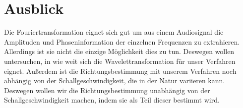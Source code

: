 \section{Ausblick} %
\iffalse
Da unser Verfahren über die Least Squares Methode sehr leicht auf eine beliebige Anzahl von Mikrofonen erweiterbar ist, wollen wir die Genauigkeit und insbesondere die Reichweite der Richtungsbestimmung noch weiter erhöhen, indem wir anstelle von vier Mikrofonen acht Mikrofone verwenden. Dies würde es uns außerdem erlauben, die Richtungsbestimmung unabhängig von der Schallgeschwindigkeit  durchzuführen, indem diese als eine weitere Variable eingeführt wird. Damit würde sich die Genauigkeit der Richtungsbestimmung weiter verbessern.

Weiterhin könnte die Richtungsbestimmung verbessert werden, indem auch die Amplituden mit einbezogen werden. Diese stehen durch die Fourier-Transformation bereits zur Verfügung und könnten ebenfalls zu einer weiteren Verbesserung der Reichweite und Genauigkeit der Richtungsbestimmung beitragen.
\fi
Die Fouriertransformation eignet sich gut um aus einem Audiosignal die Amplituden und Phaseninformation der einzelnen Frequenzen zu extrahieren. Allerdings ist sie nicht die einzige Möglichkeit dies zu tun. Deswegen wollen untersuchen, in wie weit sich die Wavelettransformation für unser Verfahren eignet. Außerdem ist die Richtungsbestimmung mit unserem Verfahren noch abhängig von der Schallgeschwindigkeit, die in der Natur variieren kann. Deswegen wollen wir die Richtungsbestimmung unabhängig von der Schallgeschwindigkeit machen, indem sie als Teil dieser bestimmt wird.